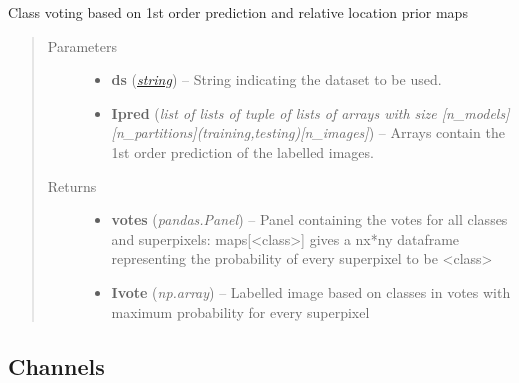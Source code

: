 \documentclass[letterpaper,10pt,english]{sphinxmanual}
\begin{document}
\begin{fulllineitems}
\label{flamingo/classification/index:flamingo.classification.features.relativelocation.vote_image}
Class voting based on 1st order prediction and relative location prior maps
\begin{quote}\begin{description}
\item[{Parameters}] \leavevmode\begin{itemize}
\item {} 
\textbf{ds} (\href{http://docs.python.org/library/string.html\#module-string}{\emph{string}}) -- String indicating the dataset to be used.

\item {} 
\textbf{Ipred} (\emph{list of lists of tuple of lists of arrays with size {[}n\_models{]}{[}n\_partitions{]}(training,testing){[}n\_images{]}}) -- Arrays contain the 1st order prediction of the labelled images.

\end{itemize}

\item[{Returns}] \leavevmode
\begin{itemize}
\item {} 
\textbf{votes} (\emph{pandas.Panel}) --
Panel containing the votes for all classes and superpixels: maps{[}\textless{}class\textgreater{}{]}
gives a nx*ny dataframe representing the probability of every superpixel to be \textless{}class\textgreater{}

\item {} 
\textbf{Ivote} (\emph{np.array}) --
Labelled image based on classes in votes with maximum probability for every superpixel

\end{itemize}


\end{description}\end{quote}

\end{fulllineitems}



\subsection{Channels}
\label{flamingo/classification/index:channels}\label{flamingo/classification/index:module-flamingo.classification.channels}
\end{document}
